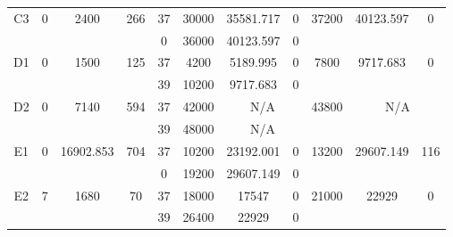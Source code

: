 \begin{sidewaystable}
\begin{tabular}{c||c|c|c||c|c|c|c||c|c|c}
         &
        
      \\
      \hline
      \multirow{2}{*}{C3} &
      \multirow{2}{*}{0} &
      \multirow{2}{*}{2400} &
      \multirow{2}{*}{266} &
      37 &
      30000 &
        35581.717 &
        0 &
      \multirow{2}{*}{37200} &
        \multirow{2}{*}{40123.597} &
        \multirow{2}{*}{0}
      \\
      \cline{5-8}
       &
       &
       &
       &
      0 &
      36000 &
        40123.597 &
        0 &
      
         &
        
      \\
      \hline
      \multirow{2}{*}{D1} &
      \multirow{2}{*}{0} &
      \multirow{2}{*}{1500} &
      \multirow{2}{*}{125} &
      37 &
      4200 &
        5189.995 &
        0 &
      \multirow{2}{*}{7800} &
        \multirow{2}{*}{9717.683} &
        \multirow{2}{*}{0}
      \\
      \cline{5-8}
       &
       &
       &
       &
      39 &
      10200 &
        9717.683 &
        0 &
      
         &
        
      \\
      \hline
      \multirow{2}{*}{D2} &
      \multirow{2}{*}{0} &
      \multirow{2}{*}{7140} &
      \multirow{2}{*}{594} &
      37 &
      42000 &
        \multicolumn{2}{|c||}{N/A} &
      \multirow{2}{*}{43800} &
        \multicolumn{2}{c}{\multirow{2}{*}{N/A}}
      \\
      \cline{5-8}
       &
       &
       &
       &
      39 &
      48000 &
        \multicolumn{2}{|c||}{N/A} &
      
        
      \\
      \hline
      \multirow{2}{*}{E1} &
      \multirow{2}{*}{0} &
      \multirow{2}{*}{16902.853} &
      \multirow{2}{*}{704} &
      37 &
      10200 &
        23192.001 &
        0 &
      \multirow{2}{*}{13200} &
        \multirow{2}{*}{29607.149} &
        \multirow{2}{*}{116}
      \\
      \cline{5-8}
       &
       &
       &
       &
      0 &
      19200 &
        29607.149 &
        0 &
      
         &
        
      \\
      \hline
      \multirow{2}{*}{E2} &
      \multirow{2}{*}{7} &
      \multirow{2}{*}{1680} &
      \multirow{2}{*}{70} &
      37 &
      18000 &
        17547 &
        0 &
      \multirow{2}{*}{21000} &
        \multirow{2}{*}{22929} &
        \multirow{2}{*}{0}
      \\
      \cline{5-8}
       &
       &
       &
       &
      39 &
      26400 &
        22929 &
        0 &
      

\end{tabular}
\end{sidewaystable}

